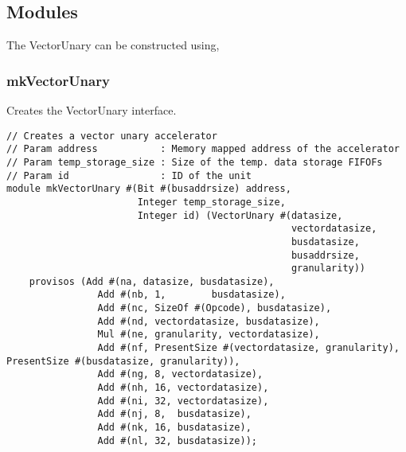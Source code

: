 \begin{paper}
\section*{Modules\sdot}
The VectorUnary can be constructed using,
\subsubsection*{mkVectorUnary\sdot}
Creates the VectorUnary interface.
\begin{verbatim}
// Creates a vector unary accelerator
// Param address           : Memory mapped address of the accelerator
// Param temp_storage_size : Size of the temp. data storage FIFOFs
// Param id                : ID of the unit
module mkVectorUnary #(Bit #(busaddrsize) address, 
                       Integer temp_storage_size, 
                       Integer id) (VectorUnary #(datasize, 
                                                  vectordatasize, 
                                                  busdatasize, 
                                                  busaddrsize, 
                                                  granularity))
    provisos (Add #(na, datasize, busdatasize), 
                Add #(nb, 1,        busdatasize), 
                Add #(nc, SizeOf #(Opcode), busdatasize), 
                Add #(nd, vectordatasize, busdatasize),
                Mul #(ne, granularity, vectordatasize),
                Add #(nf, PresentSize #(vectordatasize, granularity), PresentSize #(busdatasize, granularity)),
                Add #(ng, 8, vectordatasize),
                Add #(nh, 16, vectordatasize),
                Add #(ni, 32, vectordatasize),
                Add #(nj, 8,  busdatasize),
                Add #(nk, 16, busdatasize),
                Add #(nl, 32, busdatasize));
\end{verbatim}
\end{paper}


